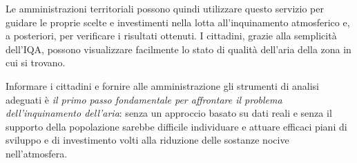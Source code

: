 Le amministrazioni territoriali possono quindi utilizzare questo servizio per
guidare le proprie scelte e investimenti nella lotta all'inquinamento
atmosferico e, a posteriori, per verificare i risultati ottenuti. I cittadini,
grazie alla semplicità dell'IQA, possono visualizzare facilmente lo stato di
qualità dell'aria della zona in cui si trovano.

Informare i cittadini e fornire alle amministrazione gli strumenti di analisi
adeguati è \emph{il primo passo fondamentale per affrontare il problema
dell'inquinamento dell'aria}: senza un approccio basato su dati reali e senza il
supporto della popolazione sarebbe difficile individuare e attuare efficaci
piani di sviluppo e di investimento volti alla riduzione delle sostanze nocive
nell'atmosfera.
